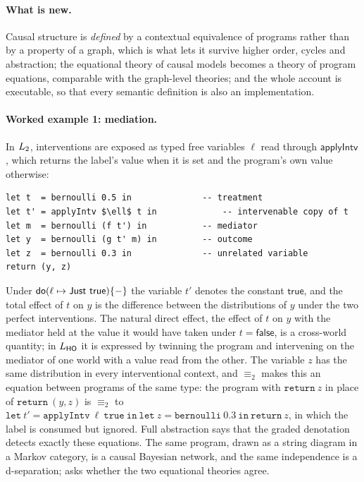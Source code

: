 \paragraph{What is new.} Causal structure is \emph{defined} by a contextual equivalence of programs rather than by a property of a graph, which is what lets it survive higher order, cycles and abstraction; the equational theory of causal models becomes a theory of program equations, comparable with the graph-level theories; and the whole account is executable, so that every semantic definition is also an implementation.

\paragraph{Worked example 1: mediation.} In $L_{2}$, interventions are exposed as typed free variables $\ell$ read through $\mathsf{applyIntv}$, which returns the label's value when it is set and the program's own value otherwise:
\begin{lstlisting}
let t  = bernoulli 0.5 in              -- treatment
let t' = applyIntv $\ell$ t in             -- intervenable copy of t
let m  = bernoulli (f t') in           -- mediator
let y  = bernoulli (g t' m) in         -- outcome
let z  = bernoulli 0.3 in              -- unrelated variable
return (y, z)
\end{lstlisting}
Under $\dok(\ell\mapsto\mathsf{Just}\ \mathsf{true})\{-\}$ the variable $t'$ denotes the constant $\mathsf{true}$, and the total effect of $t$ on $y$ is the difference between the distributions of $y$ under the two perfect interventions. The natural direct effect, the effect of $t$ on $y$ with the mediator held at the value it would have taken under $t=\mathsf{false}$, is a cross-world quantity; in $L_{\mathsf{HO}}$ it is expressed by twinning the program and intervening on the mediator of one world with a value read from the other. The variable $z$ has the same distribution in every interventional context, and $\equiv_2$ makes this an equation between programs of the same type: the program with $\mathtt{return}\ z$ in place of $\mathtt{return}\ (y,z)$ is $\equiv_2$ to $\mathtt{let}\ t' = \mathtt{applyIntv}\ \ell\ \mathtt{true}\ \mathtt{in}\ \mathtt{let}\ z = \mathtt{bernoulli}\ 0.3\ \mathtt{in}\ \mathtt{return}\ z$, in which the label is consumed but ignored. Full abstraction says that the graded denotation detects exactly these equations. The same program, drawn as a string diagram in a Markov category, is a causal Bayesian network, and the same independence is a d-separation;  asks whether the two equational theories agree.


